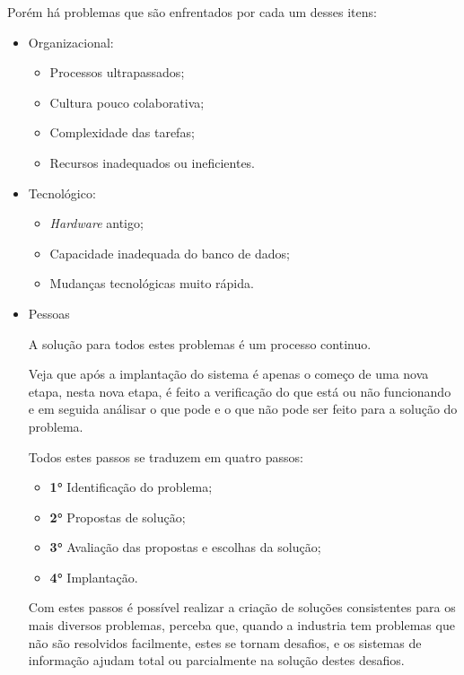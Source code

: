 \documentclass[
	12pt,				%
	openany,			%
	a4paper,			%
	chapter=TITLE,		%
	section=TITLE,		%
	english,
	brazil				%
]{abntex2}
\begin{document}
Porém há problemas que são enfrentados por cada um desses itens:
	\begin{itemize}
		\item Organizacional:
			\begin{itemize}
				\item Processos ultrapassados;
				\item Cultura pouco colaborativa;
				\item Complexidade das tarefas;
				\item Recursos inadequados ou ineficientes.
			\end{itemize}
		\item Tecnológico:
		\begin{itemize}
			\item \textit{Hardware} antigo;
			\item Capacidade inadequada do banco de dados;
			\item Mudanças tecnológicas muito rápida.
		\end{itemize}
		\item Pessoas

A solução para todos estes problemas é um processo continuo.

Veja que após a implantação do sistema é apenas o começo de uma nova etapa, nesta nova etapa, é feito a verificação do que está ou não funcionando e em seguida análisar o que pode e o que não pode ser feito para a solução do problema.

Todos estes passos se traduzem em quatro passos:

\begin{itemize}
	\item \textbf{1°} Identificação do problema;
	\item \textbf{2°} Propostas de solução;
	\item \textbf{3°} Avaliação das propostas e escolhas da solução;
	\item \textbf{4°} Implantação.
\end{itemize}

Com estes passos é possível realizar a criação de soluções consistentes para os mais diversos problemas, perceba que, quando a industria tem problemas que não são resolvidos facilmente, estes se tornam desafios, e os sistemas de informação ajudam total ou parcialmente na solução destes desafios.


\end{itemize}
\end{document}
